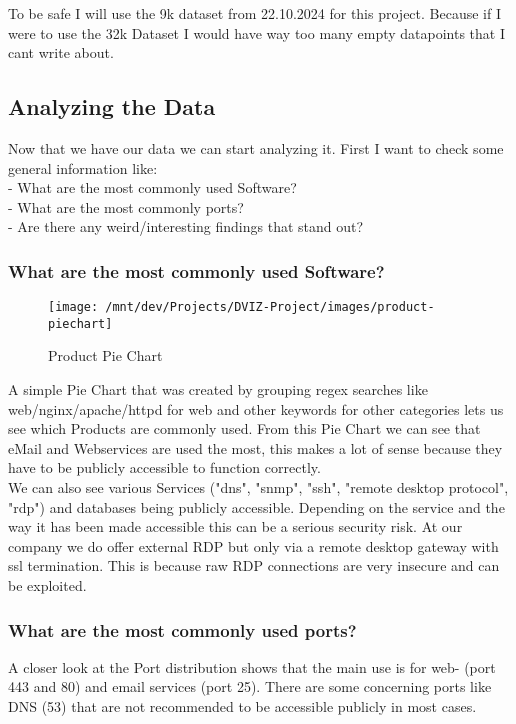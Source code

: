 \documentclass[11pt,a4paper]{article}
\begin{document}
\begin{data}
To be safe I will use the 9k dataset from 22.10.2024 for this project. Because if I were to use the 32k Dataset I would have
way too many empty datapoints that I cant write about.

\subsection{Analyzing the Data}
Now that we have our data we can start analyzing it. First I want to check some general information like: \\
- What are the most commonly used Software?\\
- What are the most commonly ports?\\
- Are there any weird/interesting findings that stand out?\\

\newpage
\subsubsection{What are the most commonly used Software?}
\begin{figure}[!h]
    \centering
    \texttt{[image: /mnt/dev/Projects/DVIZ-Project/images/product-piechart]}
    \caption{Product Pie Chart}
    \label{fig:product-piechart}
\end{figure}

A simple Pie Chart that was created by grouping regex searches like web/nginx/apache/httpd for web and other keywords for other categories lets us see
which Products are commonly used. From this Pie Chart we can see that eMail and Webservices are used the most, this makes a lot of sense
because they have to be publicly accessible to function correctly.\\

We can also see various Services ("dns", "snmp", "ssh", "remote desktop protocol", "rdp") and databases being publicly accessible.
Depending on the service and the way it has been made accessible this can be a serious security risk. At our company we do offer external RDP
but only via a remote desktop gateway with ssl termination. This is because raw RDP connections are very insecure and can be exploited.

\newpage

\subsubsection{What are the most commonly used ports?}
A closer look at the Port distribution shows that the main use is for web- (port 443 and 80) and email services (port 25). There are
some concerning ports like DNS (53) that are not recommended to be accessible publicly in most cases.


\end{data}
\end{document}
